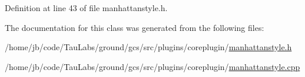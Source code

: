 \-Definition at line 43 of file manhattanstyle.\-h.



\-The documentation for this class was generated from the following files\-:\begin{DoxyCompactItemize}
\item 
/home/jb/code/\-Tau\-Labs/ground/gcs/src/plugins/coreplugin/\hyperlink{manhattanstyle_8h}{manhattanstyle.\-h}\item 
/home/jb/code/\-Tau\-Labs/ground/gcs/src/plugins/coreplugin/\hyperlink{manhattanstyle_8cpp}{manhattanstyle.\-cpp}\end{DoxyCompactItemize}
